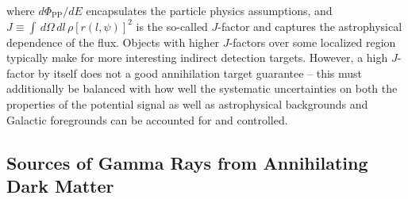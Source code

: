 where $d\Phi_\mathrm{PP}/dE$ encapsulates the particle physics assumptions, and $J\equiv\int\,d\Omega\,dl\,\rho[r(l,\psi)]^2$ is the so-called $J$-factor and captures the astrophysical dependence of the flux. Objects with higher $J$-factors over some localized region typically make for more interesting indirect detection targets. However, a high $J$-factor by itself does not a good annihilation target guarantee -- this must additionally be balanced with how well the systematic uncertainties on both the properties of the potential signal as well as astrophysical backgrounds and Galactic foregrounds can be accounted for and controlled.

\subsection{Sources of Gamma Rays from Annihilating Dark Matter}

